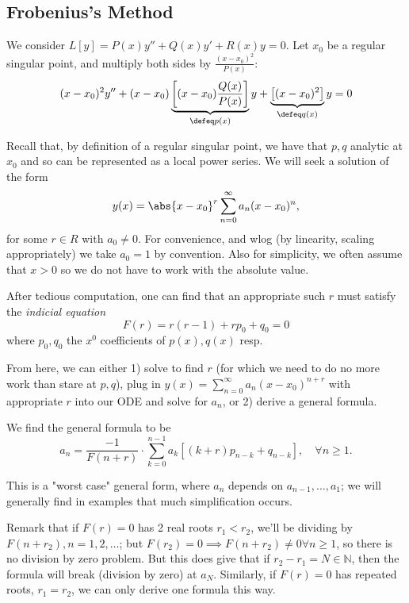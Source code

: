 \subsection{Frobenius's Method}
We consider $L[y] = P(x) y'' + Q(x) y' + R(x) y = 0$. Let $x_0$ be a regular singular point, and multiply both sides by $\frac{(x-x_0)^2}{P(x)}$:
\[
(x-x_0)^2 y'' + (x-x_0)\underbrace{\left[(x-x_0) \frac{Q(x)}{P(x)}\right]}_{\defeq p(x)}y + \underbrace{\left[(x-x_0)^2\right]}_{\defeq q(x)} y = 0
\]

Recall that, by definition of a regular singular point, we have that $p, q$ analytic at $x_0$ and so can be represented as a local power series. We will seek a solution of the form \begin{align*}
    y(x) = \abs{x - x_0}^r \sum_{n=0}^\infty a_n (x - x_0)^n,
\end{align*}
for some $r \in R$ with $a_0 \neq 0$. For convenience, and wlog (by linearity, scaling appropriately) we take $a_0 = 1$ by convention. Also for simplicity, we often assume that $x > 0$ so we do not have to work with the absolute value. 

After tedious computation, one can find that an appropriate such $r$ must satisfy the \emph{indicial equation} \[
F(r) = r(r-1) + r p_0 + q_0   =0    
\]
where $p_0, q_0$ the $x^0$ coefficients of $p(x), q(x)$ resp.

From here, we can either 1) solve to find $r$ (for which we need to do no more work than stare at $p, q$), plug in $y(x) = \sum_{n=0}^\infty a_n (x-x_0)^{n+r}$ with appropriate $r$ into our ODE and solve for $a_n$, or 2) derive a general formula. 


We find the general formula to be \[
a_n = \frac{-1}{F(n+r)}\cdot \sum_{k=0}^{n-1} a_k\left[ (k+r)p_{n-k} + q_{n-k}\right], \quad \forall n \geq 1.
\]
\begin{remark}
    This is a "worst case" general form, where $a_n$ depends on $a_{n-1}, \dots, a_1$; we will generally find in examples that much simplification occurs.
\end{remark}

\begin{remark}
    Remark that if $F(r) = 0$ has 2 real roots $r_1 < r_2$, we'll be dividing by $F(n + r_2), n = 1, 2, \dots$; but $F(r_2) = 0 \implies F(n + r_2) \neq 0 \forall n \geq 1$, so there is no division by zero problem. But this does give that if $r_2 - r_1 = N \in \mathbb{N}$, then the formula will break (division by zero) at $a_N$. Similarly, if $F(r) = 0$ has repeated roots, $r_1 = r_2$, we can only derive one formula this way.
\end{remark}

